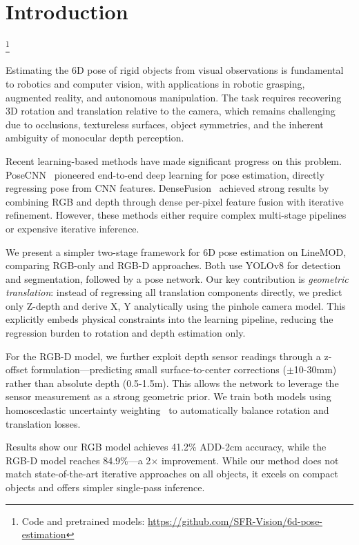 \section{Introduction}\footnote{Code and pretrained models: \url{https://github.com/SFR-Vision/6d-pose-estimation}}
\label{sec:intro}

Estimating the 6D pose of rigid objects from visual observations is fundamental to robotics and computer vision, with applications in robotic grasping, augmented reality, and autonomous manipulation. The task requires recovering 3D rotation and translation relative to the camera, which remains challenging due to occlusions, textureless surfaces, object symmetries, and the inherent ambiguity of monocular depth perception.

Recent learning-based methods have made significant progress on this problem. PoseCNN~\cite{xiang2018posecnn} pioneered end-to-end deep learning for pose estimation, directly regressing pose from CNN features. DenseFusion~\cite{wang2019densefusion} achieved strong results by combining RGB and depth through dense per-pixel feature fusion with iterative refinement. However, these methods either require complex multi-stage pipelines or expensive iterative inference.

We present a simpler two-stage framework for 6D pose estimation on LineMOD, comparing RGB-only and RGB-D approaches. Both use YOLOv8 for detection and segmentation, followed by a pose network. Our key contribution is \textit{geometric translation}: instead of regressing all translation components directly, we predict only Z-depth and derive X, Y analytically using the pinhole camera model. This explicitly embeds physical constraints into the learning pipeline, reducing the regression burden to rotation and depth estimation only.

For the RGB-D model, we further exploit depth sensor readings through a z-offset formulation---predicting small surface-to-center corrections ($\pm$10-30mm) rather than absolute depth (0.5-1.5m). This allows the network to leverage the sensor measurement as a strong geometric prior. We train both models using homoscedastic uncertainty weighting~\cite{kendall2018multi} to automatically balance rotation and translation losses.

Results show our RGB model achieves 41.2\% ADD-2cm accuracy, while the RGB-D model reaches 84.9\%---a 2$\times$ improvement. While our method does not match state-of-the-art iterative approaches on all objects, it excels on compact objects and offers simpler single-pass inference.
